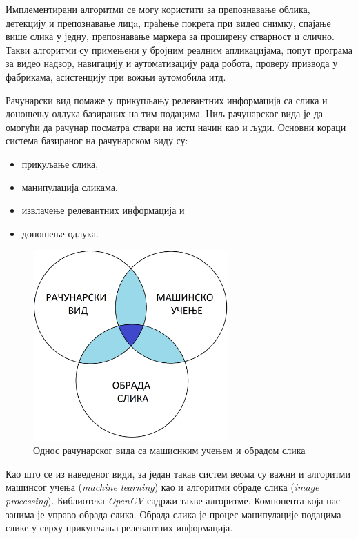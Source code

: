 \documentclass[11pt,a4paper,serbian,oneside]{book}
\begin{document}
Имплементирани алгоритми се могу користити за  препознавање облика, детекцију и препознавање лицa, праћење покрета при видео снимку, спајање више слика у једну, препознавање маркера за проширену стварност и слично. Такви алгоритми су примењени у бројним реалним апликацијама, попут програма за видео надзор, навигацију и аутоматизацију рада робота, проверу призвода у фабрикама, асистенцију при вожњи аутомобила итд.

Рачунарски вид помаже у прикупљању релевантних информација са слика и доношењу одлука базираних на тим подацима. Циљ рачунарског вида је да омогући да рачунар посматра ствари на исти начин као и људи. Основни кораци система базираног на рачунарском виду су:

\begin{itemize} %
  \item прикуљање слика,
  \item манипулација сликама,
  \item извлачење релевантних информација и
  \item доношење одлука.
\end{itemize}

\begin{figure}[h]
\begin{center}
\includegraphics[width=75mm]{images/cv.png}
\end{center}
\caption{Однос рачунарског вида са машиснким учењем и обрадом слика}
\label{fig:cv}
\end{figure}

Као што се из наведеног види, за један такав систем веома су важни и алгоритми машинсог учења (\textit{machine learning}) као и алгоритми обраде слика (\textit{image processing}). Библиотека \textit{OpenCV} садржи такве алгоритме. Компонента која нас занима је управо обрада слика. Обрада слика је процес манипулације подацима слике у сврху прикупљања релевантних информација. 
\end{document}
